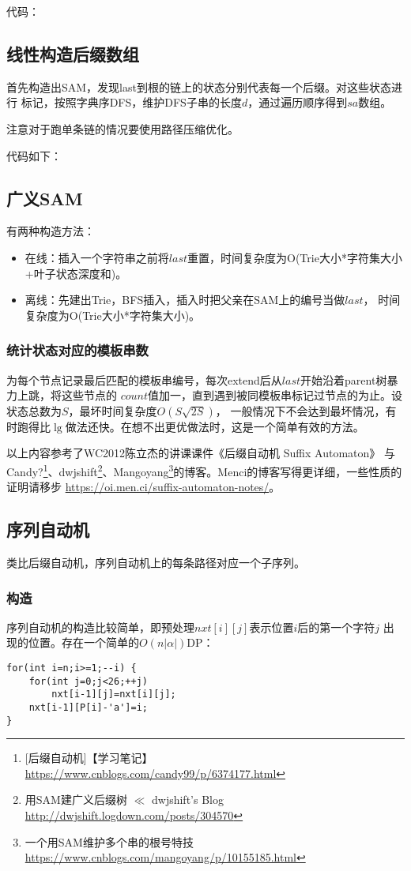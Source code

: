 代码：

\subsection{线性构造后缀数组}
首先构造出SAM，发现last到根的链上的状态分别代表每一个后缀。对这些状态进行
标记，按照字典序DFS，维护DFS子串的长度$d$，通过遍历顺序得到$sa$数组。

注意对于跑单条链的情况要使用路径压缩优化。

代码如下：

\subsection{广义SAM}
有两种构造方法：
\begin{itemize}
    \item 在线：插入一个字符串之前将$last$重置，时间复杂度为O(Trie大小*字符集大小
    +叶子状态深度和)。
    \item 离线：先建出Trie，BFS插入，插入时把父亲在SAM上的编号当做$last$，
    时间复杂度为O(Trie大小*字符集大小)。
\end{itemize}

\subsubsection{统计状态对应的模板串数}
为每个节点记录最后匹配的模板串编号，每次extend后从$last$开始沿着parent树暴力上跳，将这些节点的
$count$值加一，直到遇到被同模板串标记过节点的为止。设状态总数为$S$，最坏时间复杂度$O(S\sqrt{2S})$，
一般情况下不会达到最坏情况，有时跑得比$\lg$做法还快。在想不出更优做法时，这是一个简单有效的方法。

以上内容参考了WC2012陈立杰的讲课课件《后缀自动机 Suffix Automaton》
与Candy?\footnote{[后缀自动机]【学习笔记】
    \url{https://www.cnblogs.com/candy99/p/6374177.html}
}、dwjshift\footnote{
    用SAM建广义后缀树 $\ll$ dwjshift's Blog
    \url{http://dwjshift.logdown.com/posts/304570}
}、Mangoyang\footnote{
    一个用SAM维护多个串的根号特技
    \url{https://www.cnblogs.com/mangoyang/p/10155185.html}
}的博客。Menci的博客写得更详细，一些性质的证明请移步
\url{https://oi.men.ci/suffix-automaton-notes/}。

\subsection{序列自动机}
类比后缀自动机，序列自动机上的每条路径对应一个子序列。

\subsubsection{构造}
序列自动机的构造比较简单，即预处理$nxt[i][j]$表示位置$i$后的第一个字符$j$
出现的位置。存在一个简单的$O(n|\alpha|)$DP：
\begin{lstlisting}
for(int i=n;i>=1;--i) {
    for(int j=0;j<26;++j)
        nxt[i-1][j]=nxt[i][j];
    nxt[i-1][P[i]-'a']=i;
}
\end{lstlisting}

